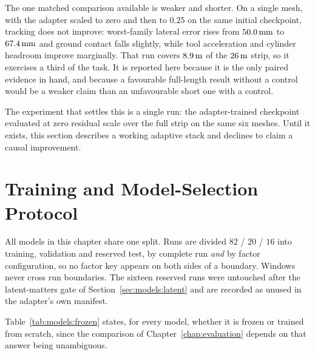 The one matched comparison available is weaker and shorter. On a single mesh,
with the adapter scaled to zero and then to $0.25$ on the same initial
checkpoint, tracking does not improve: worst-family lateral error rises from
$\unit[50.0]{mm}$ to $\unit[67.4]{mm}$ and ground contact falls slightly, while
tool acceleration and cylinder headroom improve marginally. That run covers
$\unit[8.9]{m}$ of the $\unit[26]{m}$ strip, so it exercises a third of the
task. It is reported here because it is the only paired evidence in hand, and
because a favourable full-length result without a control would be a weaker
claim than an unfavourable short one with a control.

The experiment that settles this is a single run: the adapter-trained
checkpoint evaluated at zero residual scale over the full strip on the same six
meshes. Until it exists, this section describes a working adaptive stack and
declines to claim a causal improvement.


\section{Training and Model-Selection Protocol}
\label{sec:models:training}
All models in this chapter share one split. Runs are divided $82$ / $20$ /
$16$ into training, validation and reserved test, by complete run \emph{and} by
factor configuration, so no factor key appears on both sides of a boundary.
Windows never cross run boundaries. The sixteen reserved runs were untouched
after the latent-matters gate of Section~\ref{sec:models:latent} and are
recorded as unused in the adapter's own manifest.

Table~\ref{tab:models:frozen} states, for every model, whether it is frozen or
trained from scratch, since the comparison of Chapter~\ref{chap:evaluation}
depends on that answer being unambiguous.

